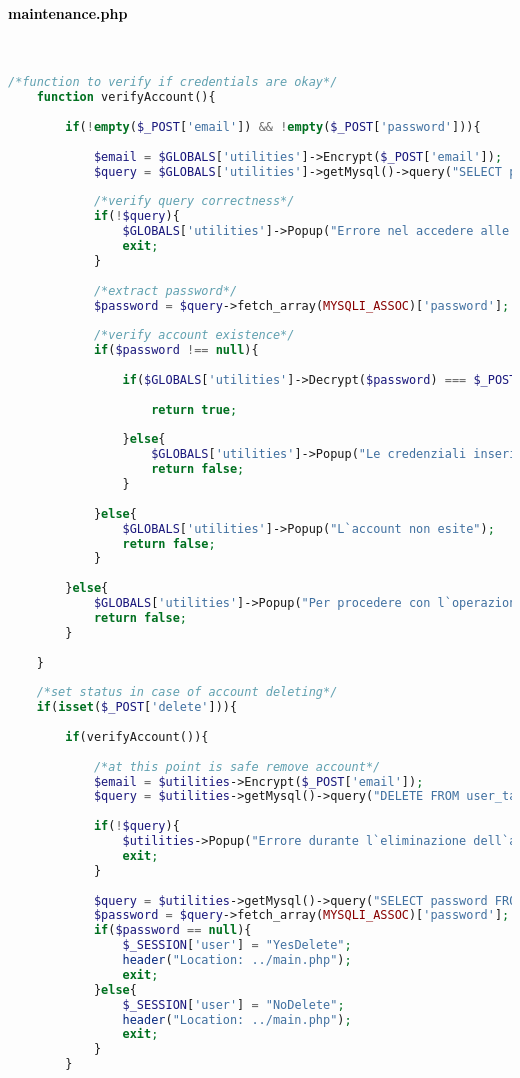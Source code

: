 \paragraph{\textcolor{black}{maintenance.php}}\leavevmode\\
\raggedright
\begin{lstlisting}[language=php]
	/*function to verify if credentials are okay*/
	function verifyAccount(){
		
		if(!empty($_POST['email']) && !empty($_POST['password'])){
			
			$email = $GLOBALS['utilities']->Encrypt($_POST['email']);
			$query = $GLOBALS['utilities']->getMysql()->query("SELECT password FROM user_table1 WHERE (email = '{$email}')");
			
			/*verify query correctness*/
			if(!$query){
				$GLOBALS['utilities']->Popup("Errore nel accedere alle informazioni");
				exit;
			}
			
			/*extract password*/
			$password = $query->fetch_array(MYSQLI_ASSOC)['password'];
			
			/*verify account existence*/
			if($password !== null){
				
				if($GLOBALS['utilities']->Decrypt($password) === $_POST['password']){
					
					return true;
					
				}else{
					$GLOBALS['utilities']->Popup("Le credenziali inserite non sono corrette");
					return false;
				}
				
			}else{
				$GLOBALS['utilities']->Popup("L`account non esite");
				return false;
			}
			
		}else{
			$GLOBALS['utilities']->Popup("Per procedere con l`operazione i campi devono essere tutti riempiti");
			return false;
		}
		
	}
	
	/*set status in case of account deleting*/
	if(isset($_POST['delete'])){
		
		if(verifyAccount()){
			
			/*at this point is safe remove account*/
			$email = $utilities->Encrypt($_POST['email']);
			$query = $utilities->getMysql()->query("DELETE FROM user_table1 WHERE (email = '{$email}')");
			
			if(!$query){
				$utilities->Popup("Errore durante l`eliminazione dell`account");
				exit;
			}
			
			$query = $utilities->getMysql()->query("SELECT password FROM user_table1 WHERE (email = '{$email}')");
			$password = $query->fetch_array(MYSQLI_ASSOC)['password'];
			if($password == null){
				$_SESSION['user'] = "YesDelete";
				header("Location: ../main.php");
				exit;
			}else{
				$_SESSION['user'] = "NoDelete";
				header("Location: ../main.php");
				exit;
			}
		}
		

\end{lstlisting}
